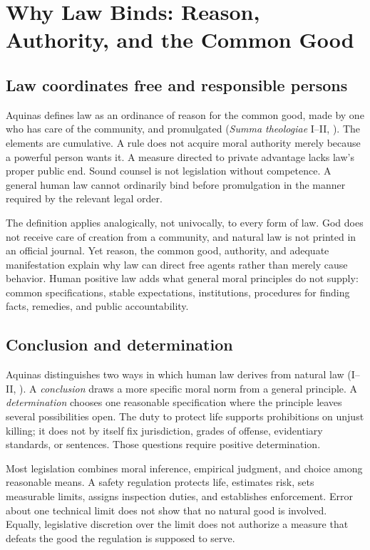 \section{Why Law Binds: Reason, Authority, and the Common Good}

\subsection{Law coordinates free and responsible persons}

Aquinas defines law as an ordinance of reason for the common good, made by one who has care of the community, and promulgated (\emph{Summa theologiae} I--II, ). The elements are cumulative. A rule does not acquire moral authority merely because a powerful person wants it. A measure directed to private advantage lacks law's proper public end. Sound counsel is not legislation without competence. A general human law cannot ordinarily bind before promulgation in the manner required by the relevant legal order.

The definition applies analogically, not univocally, to every form of law. God does not receive care of creation from a community, and natural law is not printed in an official journal. Yet reason, the common good, authority, and adequate manifestation explain why law can direct free agents rather than merely cause behavior. Human positive law adds what general moral principles do not supply: common specifications, stable expectations, institutions, procedures for finding facts, remedies, and public accountability.

\subsection{Conclusion and determination}

Aquinas distinguishes two ways in which human law derives from natural law (I--II, ). A \emph{conclusion} draws a more specific moral norm from a general principle. A \emph{determination} chooses one reasonable specification where the principle leaves several possibilities open. The duty to protect life supports prohibitions on unjust killing; it does not by itself fix jurisdiction, grades of offense, evidentiary standards, or sentences. Those questions require positive determination.

Most legislation combines moral inference, empirical judgment, and choice among reasonable means. A safety regulation protects life, estimates risk, sets measurable limits, assigns inspection duties, and establishes enforcement. Error about one technical limit does not show that no natural good is involved. Equally, legislative discretion over the limit does not authorize a measure that defeats the good the regulation is supposed to serve.

